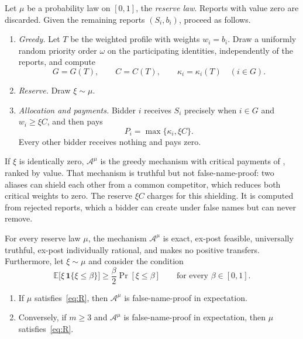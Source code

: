 \documentclass[format=acmsmall, review=false]{acmart}
\newcommand{\E}{\mathbb{E}}
\begin{document}
\begin{definition}
\label{def:reserve-greedy}
Let \(\mu\) be a probability law on \([0,1]\), the
\emph{reserve law}. Reports with value zero are discarded. Given
the remaining reports \((S_i,b_i)\), proceed as follows.
\begin{enumerate}
\item \emph{Greedy.} Let \(T\) be the weighted profile with
weights \(w_i=b_i\). Draw a uniformly random priority order
\(\omega\) on the participating identities, independently of the
reports, and compute
\[
G=G(T),\qquad
C=C(T),\qquad
\kappa_i=\kappa_i(T)\quad(i\in G).
\]
\item \emph{Reserve.} Draw \(\xi\sim\mu\).
\item \emph{Allocation and payments.} Bidder \(i\) receives
\(S_i\) precisely when \(i\in G\) and \(w_i\ge\xi C\), and then
pays
\begin{equation}\label{eq:base-payment}
P_i=\max\{\kappa_i,\xi C\}.
\end{equation}
Every other bidder receives nothing and pays zero.
\end{enumerate}
\end{definition}

If \(\xi\) is identically zero, \(\mathcal A^{\mu}\) is the
greedy mechanism with critical payments of
\citet{lehmann2002truth}, ranked by value. That mechanism is
truthful but not false-name-proof: two aliases can shield each
other from a common competitor, which reduces both critical
weights to zero. The reserve \(\xi C\) charges for this
shielding. It is computed from rejected reports, which a bidder
can create under false names but can never remove.

\begin{theorem}
\label{thm:reserve}
For every reserve law \(\mu\), the mechanism \(\mathcal A^{\mu}\)
is exact, ex-post feasible, universally truthful, ex-post
individually rational, and makes no positive transfers.
Furthermore, let \(\xi\sim\mu\) and consider the condition
\begin{equation}\label{eq:R}
\tag{R}
\E\bigl[\xi\,\mathbf{1}\{\xi\le\beta\}\bigr]
\ge\frac{\beta}{2}\Pr[\xi\le\beta]
\qquad\text{for every }\beta\in[0,1].
\end{equation}
\begin{enumerate}
\item[(a)] If \(\mu\) satisfies~\eqref{eq:R}, then
\(\mathcal A^{\mu}\) is false-name-proof in expectation.
\item[(b)] Conversely, if \(m\ge3\) and \(\mathcal A^{\mu}\) is
false-name-proof in expectation, then \(\mu\)
satisfies~\eqref{eq:R}.
\end{enumerate}
\end{theorem}
\end{document}
